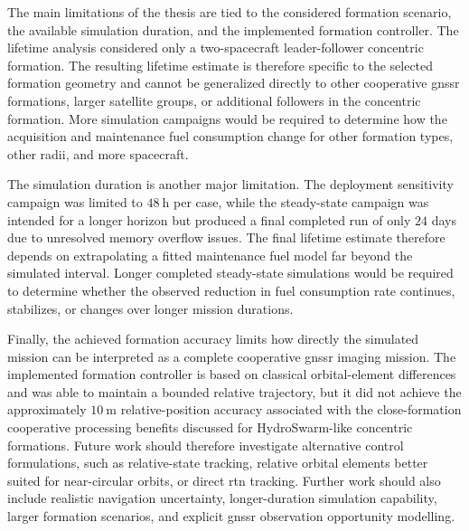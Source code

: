 The main limitations of the thesis are tied to the considered formation scenario, the available simulation duration, and the implemented formation controller. The lifetime analysis considered only a two-spacecraft leader-follower concentric formation. The resulting lifetime estimate is therefore specific to the selected formation geometry and cannot be generalized directly to other cooperative \gls{gnssr} formations, larger satellite groups, or additional followers in the concentric formation. More simulation campaigns would be required to determine how the acquisition and maintenance fuel consumption change for other formation types, other radii, and more spacecraft.

The simulation duration is another major limitation. The deployment sensitivity campaign was limited to $48~\mathrm{h}$ per case, while the steady-state campaign was intended for a longer horizon but produced a final completed run of only $24$ days due to unresolved memory overflow issues. The final lifetime estimate therefore depends on extrapolating a fitted maintenance fuel model far beyond the simulated interval. Longer completed steady-state simulations would be required to determine whether the observed reduction in fuel consumption rate continues, stabilizes, or changes over longer mission durations.

Finally, the achieved formation accuracy limits how directly the simulated mission can be interpreted as a complete cooperative \gls{gnssr} imaging mission. The implemented formation controller is based on classical orbital-element differences and was able to maintain a bounded relative trajectory, but it did not achieve the approximately $10~\mathrm{m}$ relative-position accuracy associated with the close-formation cooperative processing benefits discussed for HydroSwarm-like concentric formations. Future work should therefore investigate alternative control formulations, such as relative-state tracking, relative orbital elements better suited for near-circular orbits, or direct \gls{rtn} tracking. Further work should also include realistic navigation uncertainty, longer-duration simulation capability, larger formation scenarios, and explicit \gls{gnssr} observation opportunity modelling. 



